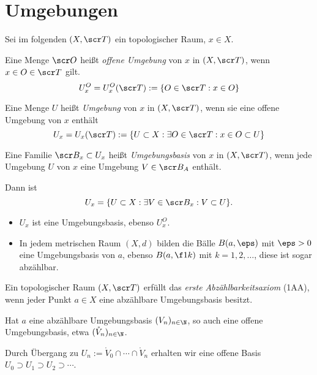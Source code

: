 \section{Umgebungen}


Sei im folgenden $(X, \scr T)$ ein topologischer Raum, $x \in X$.

\begin{df}
	Eine Menge $\scr O$ heißt \emph{offene Umgebung} von $x$ in $(X,\scr T)$, wenn $x \in O \in \scr T$ gilt.
	\[
		U_x^O = U_x^O(\scr T)
		:= \{ O \in \scr T : x \in O \}
	\]

	Eine Menge $U$ heißt \emph{Umgebung} von $x$ in $(X, \scr T)$, wenn sie eine offene Umgebung von $x$ enthält
	\[
		U_x = U_x(\scr T)
		:= \{ U \subset X : \exists O \in \scr T : x \in O \subset U \}
	\]
\end{df}

\begin{df}
	Eine Familie $\scr B_x \subset U_x$ heißt \emph{Umgebungsbasis} von $x$ in $(X, \scr T)$, wenn jede Umgebung $U$ von $x$ eine Umgebung $V \in \scr B_A$ enthält.

	Dann ist
	\[
		U_x = \{ U \subset X : \exists V \in \scr B_x : V \subset U \}.
	\]
\end{df}

\begin{ex}
	\begin{itemize}
		\item
			$U_x$ ist eine Umgebungsbasis, ebenso $U_x^O$.
		\item
			In jedem metrischen Raum $(X,d)$ bilden die Bälle $B(a,\eps)$ mit $\eps > 0$ eine Umgebungsbasis von $a$, ebenso $B(a, \f 1k)$ mit $k= 1, 2, \dotsc$,
			diese ist sogar abzählbar.
	\end{itemize}
\end{ex}

\begin{df}
	Ein topologischer Raum $(X, \scr T)$ erfüllt das \emph{erste Abzählbarkeitsaxiom} (1AA), wenn jeder Punkt $a \in X$ eine abzählbare Umgebungsbasis besitzt.
	\begin{nt*}
		Hat $a$ eine abzählbare Umgebungsbasis $(V_n)_{n\in\N}$, so auch eine offene Umgebungsbasis, etwa $(\mathring V_n)_{n\in\N}$.

		Durch Übergang zu $U_n := \mathring V_0 \cap \dotsb \cap \mathring V_n$ erhalten wir eine offene Basis $U_0 \supset U_1 \supset U_2 \supset \dotsb$.
	\end{nt*}
\end{df}

